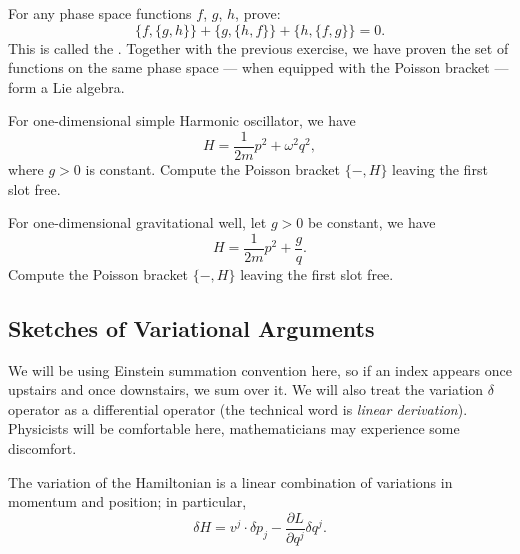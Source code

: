 \begin{exercise}
For any phase space functions $f$, $g$, $h$, prove:
\begin{equation*}
\{f,\{g,h\}\} + \{g,\{h,f\}\} + \{h,\{f,g\}\} = 0.
\end{equation*}
This is called the . Together with the previous
exercise, we have proven the set of functions on the same phase space
--- when equipped with the Poisson bracket --- form a Lie algebra.
\end{exercise}

\begin{exercise}
  For one-dimensional simple Harmonic oscillator, we have
  \begin{equation}
H = \frac{1}{2m}p^{2} + \omega^{2}q^{2},
  \end{equation}
  where $g>0$ is constant.
Compute the Poisson bracket $\{-,H\}$ leaving the first slot free.
\end{exercise}

\begin{exercise}
  For one-dimensional gravitational well, let $g>0$ be constant, we have
  \begin{equation}
H = \frac{1}{2m}p^{2} + \frac{g}{q}.
  \end{equation}
Compute the Poisson bracket $\{-,H\}$ leaving the first slot free.
\end{exercise}

\subsection{Sketches of Variational Arguments}

 We will be using Einstein summation convention here,
so if an index appears once upstairs and once downstairs, we sum over it.
We will also treat the variation $\delta$ operator as a differential
operator (the technical word is \emph{linear derivation}). Physicists
will be comfortable here, mathematicians may experience some discomfort.



\begin{theorem}\label{thm:Hamiltonian-depends-on-p-and-q}
The variation of the Hamiltonian is a linear combination of variations
in momentum and position; in particular,
\begin{equation}\label{eq:variation-of-H}
\delta H = v^{j}\cdot\delta p_{j} - \frac{\partial L}{\partial q^{j}}\delta q^{j}.
\end{equation}
\end{theorem}

